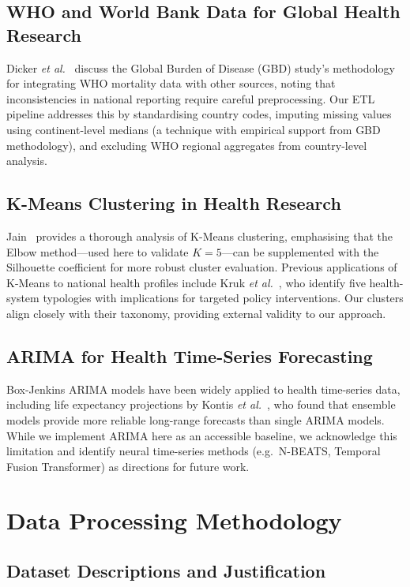 \documentclass[conference]{IEEEtran}
\begin{document}
\subsection{WHO and World Bank Data for Global Health Research}
Dicker \emph{et al.}~\cite{dicker2018} discuss the Global Burden of Disease
(GBD) study's methodology for integrating WHO mortality data with other
sources, noting that inconsistencies in national reporting require careful
preprocessing. Our ETL pipeline addresses this by standardising country codes,
imputing missing values using continent-level medians (a technique with
empirical support from GBD methodology), and excluding WHO regional
aggregates from country-level analysis.

\subsection{K-Means Clustering in Health Research}
Jain~\cite{jain2010} provides a thorough analysis of K-Means clustering,
emphasising that the Elbow method---used here to validate $K=5$---can be
supplemented with the Silhouette coefficient for more robust cluster
evaluation. Previous applications of K-Means to national health profiles
include Kruk \emph{et al.}~\cite{kruk2018}, who identify five health-system
typologies with implications for targeted policy interventions. Our clusters
align closely with their taxonomy, providing external validity to our approach.

\subsection{ARIMA for Health Time-Series Forecasting}
Box-Jenkins ARIMA models have been widely applied to health time-series data,
including life expectancy projections by Kontis \emph{et al.}~\cite{kontis2017},
who found that ensemble models provide more reliable long-range forecasts than
single ARIMA models. While we implement ARIMA here as an accessible baseline,
we acknowledge this limitation and identify neural time-series methods (e.g.\
N-BEATS, Temporal Fusion Transformer) as directions for future work.

\section{Data Processing Methodology}

\subsection{Dataset Descriptions and Justification}
\end{document}
